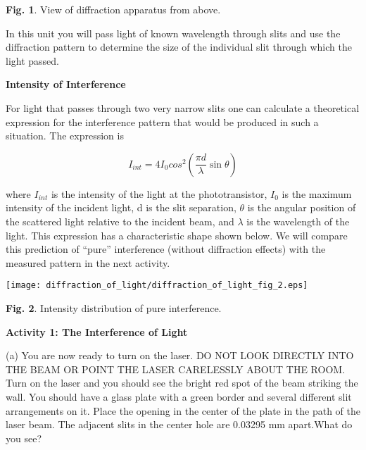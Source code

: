 {\centering \textbf{Fig. 1}. View of diffraction apparatus from above.\par}

In this unit you will  pass light of known wavelength through slits 
and use the diffraction pattern to determine the size of the individual
slit through which the light passed.

\textbf{Intensity of Interference }

For light that passes through two very narrow slits one can calculate
a theoretical expression for the interference pattern that would be
produced in such a situation. The expression is 

\begin{displaymath} I_{int} = 4I_0 cos^2 (\frac {\pi d} {\lambda} \sin \theta ) \end{displaymath}

where $I_{int}$ is the intensity of the light at the phototransistor,
$I_{0}$ is the maximum intensity of the incident light, d is
the slit separation, \( \theta  \) is the angular position of the
scattered light relative to the incident beam, and \( \lambda  \)
is the wavelength of the light. This expression has a characteristic
shape shown below. We will compare this prediction of {}``pure''
interference (without diffraction effects) with the measured pattern
in the next activity.

\vspace{0.3cm}
{\centering \texttt{[image: diffraction\_of\_light/diffraction\_of\_light\_fig\_2.eps]} \par}
\vspace{0.3cm}

{\centering \textbf{Fig. 2}. Intensity distribution of pure interference.\par}

\textbf{Activity 1: The Interference of Light }

(a) You are now ready to turn on the laser. DO NOT LOOK DIRECTLY INTO
THE BEAM OR POINT THE LASER CARELESSLY ABOUT THE ROOM. Turn on the
laser and you should see the bright red spot of the beam striking
the wall. You should have a glass plate with a green border and several
different slit arrangements on it. Place the opening in the center
of the plate in the path of the laser beam. The adjacent slits in
the center hole are 0.03295 mm apart.What do you see? 
\vspace{20mm}

